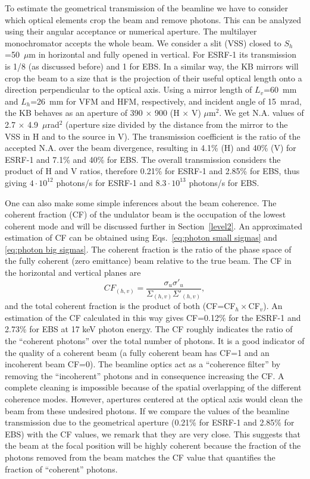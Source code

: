\documentclass{iucr}              %
\newcommand{\inred}[1]{{\color{black}#1}}
\begin{document}
To estimate the geometrical transmission of the beamline we have to consider which optical elements crop the beam and remove photons. This can be analyzed using their angular acceptance or numerical aperture. The multilayer monochromator accepts the whole beam. We consider a \inred{slit (}VSS\inred{)} closed to $S_h$=50~$\mu$m in horizontal and fully opened in vertical. For ESRF-1 its transmission is 1/8 (as discussed before) and 1 for EBS. In a similar way, the KB mirrors will crop the beam to a size that is the projection of their useful optical length onto a direction perpendicular to the optical axis. Using a mirror length of $L_v$=60~mm and $L_h$=26~mm for VFM and HFM, respectively, and incident angle of 15~mrad, the KB behaves as an aperture of  390 $\times$ 900 (H $\times$ V) $\mu$m$^2$. 
We get N.A. values of 2.7 $\times$ 4.9~$\mu$rad$^2$ (aperture size divided by the distance from the mirror to the VSS in H and to the source in V). The transmission coefficient is the ratio of the accepted N.A. over the beam divergence, resulting in 
4.1\% (H) and 40\% (V) for ESRF-1 and 7.1\% and 40\% for EBS. The overall transmission considers the product of H and V ratios, therefore 
0.21\% for ESRF-1 and 2.85\% for EBS, thus giving 
$4\cdot10^{12}$ photons/s for ESRF-1 and $8.3\cdot10^{13}$ photons/s for EBS. 

One can also make some simple inferences about the beam coherence. The coherent fraction (CF) of the undulator beam is the occupation of the lowest coherent mode \cite{arxivCF} and will be discussed further in Section~\ref{level2}. An approximated estimation of CF can be obtained using Eqs.~\ref{eq:photon small sigmas} and \ref{eq:photon big sigmas}. The coherent fraction is the ratio of the phase space of the fully coherent (zero emittance) beam relative to the true beam. The CF in the horizontal and vertical planes are
\begin{equation}\label{eq:coherent fraction}
 CF_{(h,v)} = \frac{\sigma_u \sigma'_u}{\Sigma_{(h,v)} \Sigma'_{(h,v)}},
\end{equation}
and the total coherent fraction is the product of both (CF=CF$_h \times $CF$_v$). An estimation of the CF calculated in this way gives CF=0.12\% for the ESRF-1 and 2.73\% for EBS at 17 keV photon energy. The CF roughly indicates the ratio of the ``coherent photons'' over the total number of photons. It is a good indicator of the quality of a coherent beam (a fully coherent beam has CF=1 and an incoherent beam CF=0). The beamline optics act as a ``coherence filter'' by removing the ``incoherent'' photons and in consequence increasing the CF. A complete cleaning is impossible because of the spatial overlapping of the different coherence modes. However, apertures centered at the optical axis would clean the beam from these undesired photons. If we compare the values of the beamline transmission due to the geometrical aperture  (0.21\% for ESRF-1 and 2.85\% for EBS) with the CF values, we remark that they are very close. This suggests that the beam at the focal position will be highly coherent because the fraction of the photons removed from the beam matches the CF value that quantifies the fraction of  ``coherent'' photons. 
\end{document}
